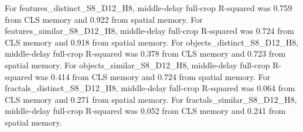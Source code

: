 \documentclass[11pt]{article}
\begin{document}
For features\_\allowbreak{}distinct\_\allowbreak{}S8\_\allowbreak{}D12\_\allowbreak{}H8, middle-delay full-crop R-squared was 0.759 from CLS memory and 0.922 from spatial memory. For features\_\allowbreak{}similar\_\allowbreak{}S8\_\allowbreak{}D12\_\allowbreak{}H8, middle-delay full-crop R-squared was 0.724 from CLS memory and 0.918 from spatial memory. For objects\_\allowbreak{}distinct\_\allowbreak{}S8\_\allowbreak{}D12\_\allowbreak{}H8, middle-delay full-crop R-squared was 0.378 from CLS memory and 0.723 from spatial memory. For objects\_\allowbreak{}similar\_\allowbreak{}S8\_\allowbreak{}D12\_\allowbreak{}H8, middle-delay full-crop R-squared was 0.414 from CLS memory and 0.724 from spatial memory. For fractals\_\allowbreak{}distinct\_\allowbreak{}S8\_\allowbreak{}D12\_\allowbreak{}H8, middle-delay full-crop R-squared was 0.064 from CLS memory and 0.271 from spatial memory. For fractals\_\allowbreak{}similar\_\allowbreak{}S8\_\allowbreak{}D12\_\allowbreak{}H8, middle-delay full-crop R-squared was 0.052 from CLS memory and 0.241 from spatial memory. 
\end{document}
